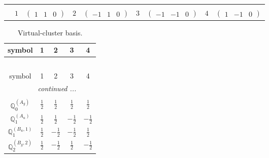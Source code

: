 \documentclass[fleqn,10pt,landscape]{article}
\begin{document}
\begin{itemize}
{\begin{center}
\begin{longtable}{ccccccccc}
 \hline \hline
\multicolumn{8}{r}{} \\ \endlastfoot

 & $ 1 $ & $ \begin{pmatrix} 1 & 1 & 0 \end{pmatrix} $ & $ 2 $ & $ \begin{pmatrix} -1 & 1 & 0 \end{pmatrix} $ & $ 3 $ & $ \begin{pmatrix} -1 & -1 & 0 \end{pmatrix} $ & $ 4 $ & $ \begin{pmatrix} 1 & -1 & 0 \end{pmatrix} $ \\
\end{longtable}
\end{center}
\begin{center}
\renewcommand{\arraystretch}{1.7}
\begin{longtable}{ccccc}
\caption{Virtual-cluster basis.}
 \\
 \hline \hline
symbol & 1 & 2 & 3 & 4 \\ \hline \endfirsthead

\multicolumn{4}{l}{\tablename\ \thetable{}} \\
 \hline \hline
symbol & 1 & 2 & 3 & 4 \\ \hline \endhead

 \hline \hline
\multicolumn{4}{r}{\footnotesize\it continued ...} \\ \endfoot

 \hline \hline
\multicolumn{4}{r}{} \\ \endlastfoot

$\mathbb{Q}_{0}^{(A_{g})}$ & $ \frac{1}{2} $ & $ \frac{1}{2} $ & $ \frac{1}{2} $ & $ \frac{1}{2} $ \\ \hline
$\mathbb{Q}_{1}^{(A_{u})}$ & $ \frac{1}{2} $ & $ \frac{1}{2} $ & $ - \frac{1}{2} $ & $ - \frac{1}{2} $ \\ \hline
$\mathbb{Q}_{1}^{(B_{u},1)}$ & $ \frac{1}{2} $ & $ - \frac{1}{2} $ & $ - \frac{1}{2} $ & $ \frac{1}{2} $ \\ \hline
$\mathbb{Q}_{2}^{(B_{g},2)}$ & $ \frac{1}{2} $ & $ - \frac{1}{2} $ & $ \frac{1}{2} $ & $ - \frac{1}{2} $ \\
\end{longtable}
\end{center}
}
\end{itemize}
\end{document}
